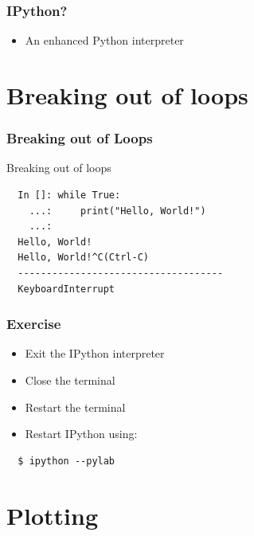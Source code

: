\documentclass[14pt,compress]{beamer}
\newcounter{time}
\newcommand{\inctime}[1]{\addtocounter{time}{#1}{\tiny \thetime\ m}}
\begin{document}
\begin{frame}[fragile]
  \frametitle{IPython? }
  \begin{itemize}
  \item An enhanced Python interpreter
  \end{itemize}
\end{frame}



\section{Breaking out of loops}
\begin{frame}[fragile]
\frametitle{Breaking out of Loops}
Breaking out of loops
\begin{lstlisting}
  In []: while True:
    ...:     print("Hello, World!")
    ...:
  Hello, World!
  Hello, World!^C(Ctrl-C)
  ------------------------------------
  KeyboardInterrupt
\end{lstlisting}
\end{frame}

\begin{frame}[fragile]
  \frametitle{Exercise}

  \begin{itemize}
  \item Exit the IPython interpreter
  \item Close the terminal
  \item Restart the terminal
  \item Restart IPython using:
  \end{itemize}
\begin{lstlisting}
  $ ipython --pylab
\end{lstlisting} %
  \inctime{10}
\end{frame}

\section{Plotting}
\end{document}
